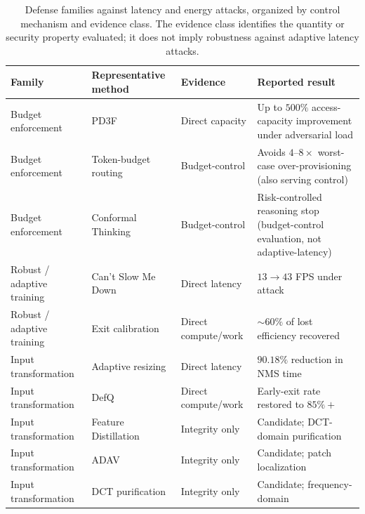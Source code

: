 \documentclass[acmsmall,screen,review,nonacm]{acmart}
\begin{document}
\begin{table}[htbp]
  \caption{Defense families against latency and energy attacks, organized by
control mechanism and evidence class. The evidence class identifies the
quantity or security property evaluated; it does not imply robustness against
adaptive latency attacks.}
  \label{tab:defenses}
  \footnotesize
  \setlength{\tabcolsep}{4pt}
  \begin{tabularx}{\linewidth}{L{2.3cm} L{2.5cm} L{2.3cm} X}
    \toprule
    \textbf{Family} & \textbf{Representative method} & \textbf{Evidence} & \textbf{Reported result} \\
    \midrule
    Budget enforcement & PD3F~\cite{zhang2025pd3f} & Direct capacity & Up to $500\%$ access-capacity improvement under adversarial load \\
    Budget enforcement & Token-budget routing~\cite{chen2026tokenbudget} & Budget-control & Avoids $4$--$8\times$ worst-case over-provisioning (also serving control) \\
    Budget enforcement & Conformal Thinking~\cite{wang2026conformal} & Budget-control & Risk-controlled reasoning stop (budget-control evaluation, not adaptive-latency) \\
    \addlinespace
    Robust / adaptive training & Can't Slow Me Down~\cite{wang2025cantslow} & Direct latency & $13\rightarrow43$ FPS under attack \\
    Robust / adaptive training & Exit calibration~\cite{varma2024slowdown} & Direct compute/work & $\sim60\%$ of lost efficiency recovered \\
    \addlinespace
    Input transformation & Adaptive resizing~\cite{schoof2024beyond} & Direct latency & $90.18\%$ reduction in NMS time \\
    Input transformation & DefQ~\cite{qiu2023defq} & Direct compute/work & Early-exit rate restored to $85\%+$ \\
    Input transformation & Feature Distillation~\cite{liu2019featuredistill} & Integrity only & Candidate; DCT-domain purification \\
    Input transformation & ADAV~\cite{mu2024adav} & Integrity only & Candidate; patch localization \\
    Input transformation & DCT purification~\cite{ren2025dct} & Integrity only & Candidate; frequency-domain \\

\end{tabularx}
\end{table}
\end{document}
